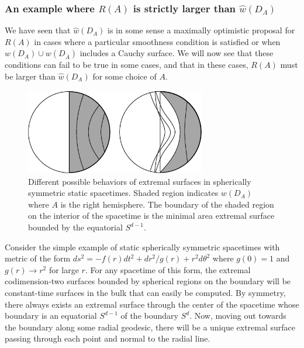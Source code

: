 \documentclass[12pt]{article}
\renewcommand{\(}{\left(}
\renewcommand{\)}{\right)}
\begin{document}
\subsubsection*{An example where $R(A)$ is strictly larger than $\hat{w}(D_A)$ }

We have seen that $\hat{w}(D_A)$ is in some sense a maximally optimistic proposal for $R(A)$ in cases where a particular smoothness condition is satisfied or when $w(D_A) \cup w(D_{\bar{A}})$ includes a Cauchy surface. We will now see that these conditions can fail to be true in some cases, and that in these cases,  $R(A)$ must be larger than $\hat{w}(D_A)$ for some choice of $A$.

\begin{figure}
\centering
\includegraphics[width=0.7\textwidth]{geodesics.eps}
\caption{Different possible behaviors of extremal surfaces in spherically symmetric static spacetimes. Shaded region indicates $w(D_A)$ where $A$ is the right hemisphere. The boundary of the shaded region on the interior of the spacetime is the minimal area extremal surface bounded by the equatorial $S^{d-1}$.}
\label{extremals}
\end{figure}

Consider the simple example of static spherically symmetric spacetimes with metric of the form $ds^2 = -f(r)dt^2 + dr^2/g(r) + r^2 d \theta^2$ where $g(0)=1$ and $g(r) \to r^2$ for large $r$. For any spacetime of this form, the extremal codimension-two surfaces bounded by spherical regions on the boundary will be constant-time surfaces in the bulk that can easily be computed. By symmetry, there always exists an extremal surface through the center of the spacetime whose boundary is an equatorial $S^{d-1}$ of the boundary $S^d$. Now, moving out towards the boundary along some radial geodesic, there will be a unique extremal surface passing through each point and normal to the radial line.
\end{document}
